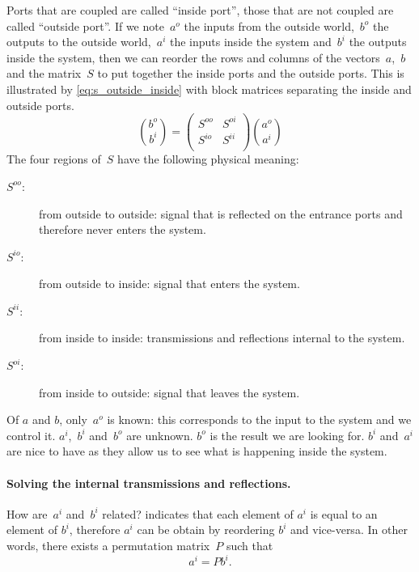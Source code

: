 Ports that are coupled are called ``inside port'', those that are not coupled are called ``outside port''.
If we note~$a^o$ the inputs from the outside world,~$b^o$ the outputs to the outside world,~$a^i$ the inputs inside the system and~$b^i$ the outputs inside the system, then we can reorder the rows and columns of the vectors~$a$,~$b$ and the matrix~$S$ to put together the inside ports and the outside ports.
This is illustrated by \cref{eq:s_outside_inside} with block matrices separating the inside and outside ports.
\begin{equation}
    \binom{b^o}{b^i} =
    \begin{pmatrix}
        S^{oo} & S^{oi} \\
        S^{io} & S^{ii} \\
    \end{pmatrix}
    \binom{a^o}{a^i}
    \label{eq:s_outside_inside}
\end{equation}
The four regions of~$S$ have the following physical meaning:
\begin{description}
    \item[$S^{oo}$:] from outside to outside: signal that is reflected on the entrance ports and therefore never enters the system.
    \item[$S^{io}$:] from outside to inside: signal that enters the system.
    \item[$S^{ii}$:] from inside to inside: transmissions and reflections internal to the system.
    \item[$S^{oi}$:] from inside to outside: signal that leaves the system.
\end{description}
Of $a$ and $b$, only~$a^o$ is known: this corresponds to the input to the system and we control it.
$a^i$,~$b^i$ and~$b^o$ are unknown.
$b^o$ is the result we are looking for.
$b^i$ and~$a^i$ are nice to have as they allow us to see what is happening inside the system.

\paragraph{Solving the internal transmissions and reflections.}
How are~$a^i$ and~$b^i$ related?
 indicates that each element of $a^i$ is equal to an element of $b^i$, therefore $a^i$ can be obtain by reordering $b^i$ and vice-versa.
In other words, there exists a permutation matrix~$P$ such that
\begin{equation}
    a^i = P b^i \text{.} \label{eq:relation_ai_bi}
\end{equation}

